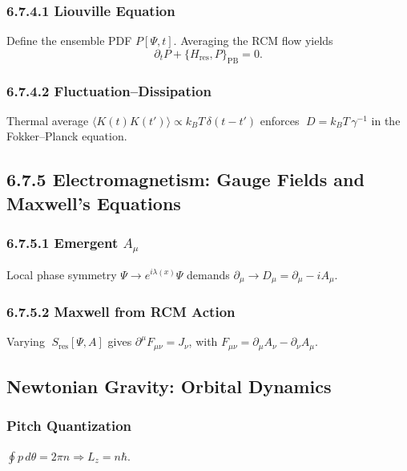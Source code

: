 \subsubsection*{6.7.4.1 Liouville Equation}

Define the ensemble PDF \(P[\Psi,t]\).  Averaging the RCM flow yields
\[
\partial_tP + \{\!H_{\mathrm{res}},P\!\}_{\mathrm{PB}} = 0.
\]

\subsubsection*{6.7.4.2 Fluctuation–Dissipation}

Thermal average \(\langle K(t)K(t')\rangle\propto k_BT\,\delta(t-t')\) enforces
\(\;D=k_BT\,\gamma^{-1}\)
in the Fokker–Planck equation.

\medskip

\subsection{6.7.5 Electromagnetism: Gauge Fields and Maxwell’s Equations}

\subsubsection*{6.7.5.1 Emergent \(A_\mu\)}

Local phase symmetry \(\Psi\to e^{i\lambda(x)}\Psi\) demands
\(\partial_\mu\to D_\mu=\partial_\mu - iA_\mu\).

\subsubsection*{6.7.5.2 Maxwell from RCM Action}

Varying
\(\;S_{\mathrm{res}}[\Psi,A]\)
gives
\(\partial^\mu F_{\mu\nu}=J_\nu\),
with \(F_{\mu\nu}=\partial_\mu A_\nu-\partial_\nu A_\mu\).

\medskip

\subsection{ Newtonian Gravity: Orbital Dynamics}

\subsubsection{Pitch Quantization}

\(\oint p\,d\theta=2\pi n\Longrightarrow L_z=n\hbar\).

